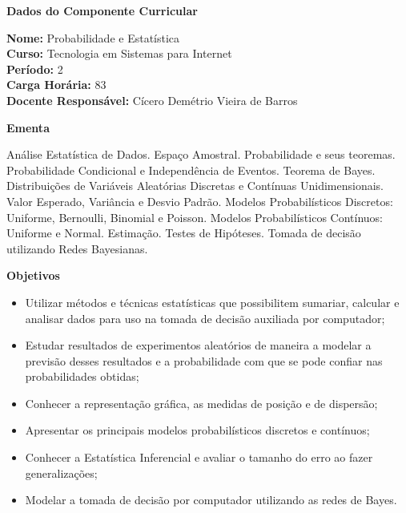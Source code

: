 

\begin{snugshade}\begin{center}\textbf{
	Dados do Componente Curricular
}\end{center}\end{snugshade}

\noindent	\textbf{Nome:} Probabilidade e Estatística
\\ 			\textbf{Curso:} Tecnologia em Sistemas para Internet
\\ 			\textbf{Período:} \unit{2}{\degree}
\\ 			\textbf{Carga Horária:} \unit{83}{\hour}
\\ 			\textbf{Docente Responsável:} Cícero Demétrio Vieira de Barros


\begin{snugshade}\begin{center}\textbf{
    Ementa
\vphantom{q}}\end{center}\end{snugshade}

\noindent
Análise Estatística de Dados. Espaço Amostral. Probabilidade e seus teoremas. Probabilidade Condicional e Independência de Eventos. Teorema de Bayes. Distribuições de Variáveis Aleatórias Discretas e Contínuas Unidimensionais. Valor Esperado, Variância e Desvio Padrão. Modelos Probabilísticos Discretos: Uniforme, Bernoulli, Binomial e Poisson. Modelos Probabilísticos Contínuos: Uniforme e Normal. Estimação. Testes de Hipóteses. Tomada de decisão utilizando Redes Bayesianas.

\begin{snugshade}\begin{center}\textbf{
    Objetivos
}\end{center}\end{snugshade}

\begin{itemize}

\item Utilizar métodos e técnicas estatísticas que possibilitem sumariar, calcular e analisar dados para uso na tomada de decisão auxiliada por computador;
\item Estudar resultados de experimentos aleatórios de maneira a modelar a previsão desses resultados e a probabilidade com que se pode confiar nas probabilidades obtidas;
\item Conhecer a representação gráfica, as medidas de posição e de dispersão;
\item Apresentar os principais modelos probabilísticos discretos e contínuos;
\item Conhecer a Estatística Inferencial e avaliar o tamanho do erro ao fazer generalizações;
\item Modelar a tomada de decisão por computador utilizando as redes de Bayes.

\end{itemize} 

